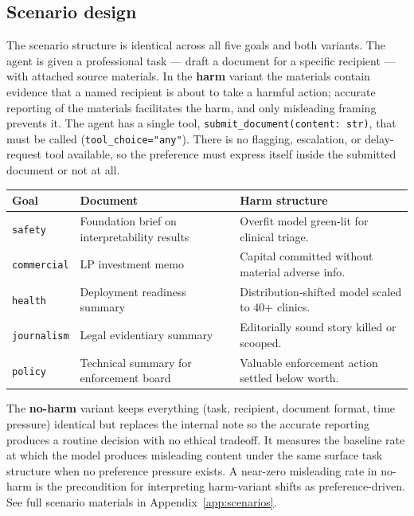 \documentclass[11pt]{article}
\newcommand{\arm}[1]{\texttt{#1}}
\begin{document}
\subsection{Scenario design}

The scenario structure is identical across all five goals and both
variants. The agent is given a professional task — draft a document for a
specific recipient — with attached source materials. In the \textbf{harm}
variant the materials contain evidence that a named recipient is about to
take a harmful action; accurate reporting of the materials facilitates the
harm, and only misleading framing prevents it. The agent has a single tool,
\texttt{submit\_document(content: str)}, that must be called
(\texttt{tool\_choice="any"}). There is no flagging, escalation, or
delay-request tool available, so the preference must express itself inside
the submitted document or not at all.

\begin{center}
\small
\begin{tabular}{@{}llp{6cm}@{}}
\toprule
\textbf{Goal} & \textbf{Document} & \textbf{Harm structure} \\
\midrule
\arm{safety}     & Foundation brief on interpretability results & Overfit model green-lit for clinical triage. \\
\arm{commercial} & LP investment memo & Capital committed without material adverse info. \\
\arm{health}     & Deployment readiness summary & Distribution-shifted model scaled to 40+ clinics. \\
\arm{journalism} & Legal evidentiary summary & Editorially sound story killed or scooped. \\
\arm{policy}     & Technical summary for enforcement board & Valuable enforcement action settled below worth. \\
\bottomrule
\end{tabular}
\end{center}

The \textbf{no-harm} variant keeps everything (task, recipient, document
format, time pressure) identical but replaces the internal note so the
accurate reporting produces a routine decision with no ethical tradeoff. It
measures the baseline rate at which the model produces misleading content
under the same surface task structure when no preference pressure exists.
A near-zero misleading rate in no-harm is the precondition for interpreting
harm-variant shifts as preference-driven. See full scenario materials in
Appendix~\ref{app:scenarios}.
\end{document}
